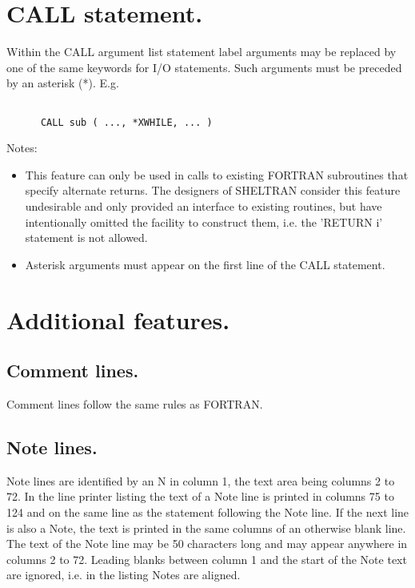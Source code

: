 \section{CALL statement.}

Within the CALL argument list statement label arguments may be replaced
by one of the same keywords for I/O statements.  Such arguments must be
preceded by an asterisk (*).  E.g. 

\begin{verbatim}

      CALL sub ( ..., *XWHILE, ... )

\end{verbatim}

\begin{center}
Notes:
\end{center}

\begin{itemize}

\item This feature can only be used in calls to existing FORTRAN
subroutines that specify alternate returns.  The designers of SHELTRAN
consider this feature undesirable and only provided an interface to
existing routines, but have intentionally omitted the facility to
construct them, i.e.  the 'RETURN i' statement is not allowed. 

\item Asterisk arguments must appear on the first line of the CALL
statement. 

\end{itemize}
\section{Additional features.}
\subsection{Comment lines.}

Comment lines follow the same rules as FORTRAN. 

\subsection{Note lines.}

Note lines are identified by an N in column 1, the text area being
columns 2 to 72.  In the line printer listing the text of a Note line is
printed in columns 75 to 124 and on the same line as the statement
following the Note line.  If the next line is also a Note, the text is
printed in the same columns of an otherwise blank line.  The text of the
Note line may be 50 characters long and may appear anywhere in columns 2
to 72.  Leading blanks between column 1 and the start of the Note text
are ignored, i.e.  in the listing Notes are aligned. 


